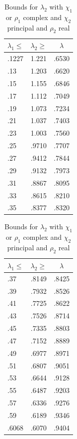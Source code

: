 \documentclass[12pt,psamsfonts]{amsart}
\theoremstyle{definition}
\theoremstyle{remark}
\numberwithin{equation}{section}
\begin{document}
\begin{table}
\begin{tabular}{l|c|c} 
 $\lambda_1 \leq$ & $\lambda_2 \geq$ & $\lambda$ \\ 
 \hline 
 .1227 &  1.221 &  .6530 \\ 
 .13 &  1.203 &  .6620 \\ 
 .15 &  1.155 &  .6846 \\ 
 .17 &  1.112 &  .7049 \\ 
 .19 &  1.073 &  .7234 \\ 
 .21 &  1.037 &  .7403 \\ 
 .23 &  1.003 &  .7560 \\ 
 .25 &  .9710 &  .7707 \\ 
 .27 &  .9412 &  .7844 \\ 
 .29 &  .9132 &  .7973 \\ 
 .31 &  .8867 &  .8095 \\ 
 .33 &  .8615 &  .8210 \\ 
 .35 &  .8377 &  .8320 \\ 
 \end{tabular}
 \qquad
 \begin{tabular}{l|c|c} 
 $\lambda_1 \leq$ & $\lambda_2 \geq$ & $\lambda$ \\ 
 \hline 
 .37 &  .8149 &  .8425 \\ 
 .39 &  .7932 &  .8526 \\ 
 .41 &  .7725 &  .8622 \\ 
 .43 &  .7526 &  .8714 \\ 
 .45 &  .7335 &  .8803 \\ 
 .47 &  .7152 &  .8889 \\ 
 .49 &  .6977 &  .8971 \\ 
 .51 &  .6807 &  .9051 \\ 
 .53 &  .6644 &  .9128 \\ 
 .55 &  .6487 &  .9203 \\ 
 .57 &  .6336 &  .9276 \\ 
 .59 &  .6189 &  .9346 \\ 
 .6068 &  .6070 &  .9404 \\ 
\end{tabular}

\caption{Bounds for $\lambda_2$ with $\chi_1$ or $\rho_1$ complex and $\chi_2$ principal and $\rho_2$ real}
\label{Table-L2-CC_Chi2Principal_Rho2Real}
\end{table}
\end{document}
